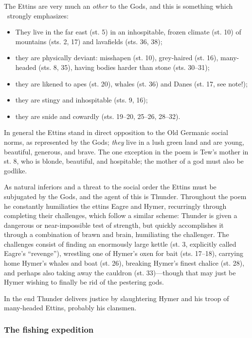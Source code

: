 {\small The Ettins are very much an \emph{other} to the Gods, and this is something which \Hymiskvida\ strongly emphasizes:

\begin{itemize}
  \item They live in the far east (st. 5) in an inhospitable, frozen climate (st. 10) of mountains (sts. 2, 17) and lavafields (sts. 36, 38);
  \item they are physically deviant: misshapen (st. 10), grey-haired (st. 16), many-headed (sts. 8, 35), having bodies harder than stone (sts. 30–31);
  \item they are likened to apes (st. 20), whales (st. 36) and Danes (st. 17, see note!);
  \item they are stingy and inhospitable (sts. 9, 16);
  \item they are snide and cowardly (sts. 19–20, 25–26, 28–32).
\end{itemize}

In general the Ettins stand in direct opposition to the Old Germanic social norms, as represented by the Gods; \emph{they} live in a lush green land and are young, beautiful, generous, and brave.  The one exception in the poem is Tew’s mother in st. 8, who is blonde, beautiful, and hospitable; the mother of a god must also be godlike.

As natural inferiors and a threat to the social order the Ettins must be subjugated by the Gods, and the agent of this is Thunder.  Throughout the poem he constantly humiliaties the ettins Eagre and Hymer, recurringly through completing their challenges, which follow a similar scheme: Thunder is given a dangerous or near-impossible test of strength, but quickly accomplishes it through a combination of brawn and brain, humiliating the challenger.  The challenges consist of finding an enormously large kettle (st. 3, explicitly called Eagre’s “revenge”), wrestling one of Hymer’s oxen for bait (sts. 17–18), carrying home Hymer’s whales and boat (st. 26), breaking Hymer’s finest chalice (st. 28), and perhaps also taking away the cauldron (st. 33)—though that may just be Hymer wishing to finally be rid of the pestering gods.

In the end Thunder delivers justice by slaughtering Hymer and his troop of many-headed Ettins, probably his clansmen.}

\subsubsection{The fishing expedition}

